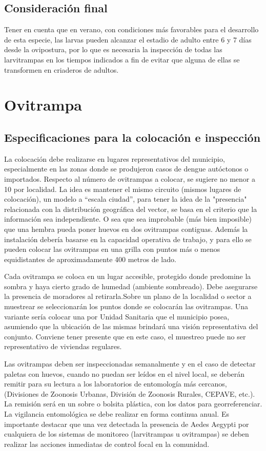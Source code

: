 \subsection{Consideración final}


Tener en cuenta que en verano, con condiciones más favorables para el desarrollo de esta especie,
las larvas pueden alcanzar el estadio de adulto entre 6 y 7 días desde la ovipostura, por lo que
es necesaria la inspección de todas las larvitrampas en los tiempos indicados a fin de evitar que
alguna de ellas se transformen en criaderos de adultos.

\section{Ovitrampa}

\subsection{Especificaciones para la colocación e inspección}
La colocación debe realizarse en lugares representativos del municipio,
especialmente en las zonas donde se produjeron casos de dengue autóctonos
o importados. Respecto al número de ovitrampas a colocar, se sugiere no
menor a 10 por localidad. La idea es mantener el mismo circuito (mismos
lugares de colocación), un modelo a “escala ciudad”, para tener la idea de
la "presencia" relacionada con la distribución geográfica del vector, se
basa en el criterio que la información sea independiente. O sea que sea
improbable (más bien imposible) que una hembra pueda poner huevos en dos
ovitrampas contiguas. Además la instalación debería basarse en la capacidad
operativa de trabajo, y para ello se pueden colocar las ovitrampas en una
grilla con puntos más o menos equidistantes de aproximadamente 400 metros
de lado.

Cada ovitrampa se coloca en un lugar accesible, protegido donde predomine
la sombra y haya cierto grado de humedad (ambiente sombreado). Debe asegurarse
la presencia de moradores al retirarla.Sobre un plano de la localidad o
sector a muestrear se seleccionarán los puntos donde se colocarán las
ovitrampas. Una variante sería colocar una por Unidad Sanitaria que el
municipio posea, asumiendo que la ubicación de las mismas brindará una
visión representativa del conjunto. Conviene tener presente que en este
caso, el muestreo puede no ser representativo de viviendas regulares.

Las ovitrampas deben ser inspeccionadas semanalmente y en el caso de detectar
paletas con huevos, cuando no puedan ser leídos en el nivel local, se deberán
remitir para su lectura a los laboratorios de entomología más cercanos,
(Divisiones de Zoonosis Urbanas, División de Zoonosis Rurales, CEPAVE, etc.).
La remisión será en un sobre o bolsita plástica, con los datos para georreferenciar.
La vigilancia entomológica se debe realizar en forma continua anual. Es
importante destacar que una vez detectada la presencia de Aedes Aegypti por
cualquiera de los sistemas de monitoreo (larvitrampas u ovitrampas) se deben
realizar las acciones inmediatas de control focal en la comunidad.

